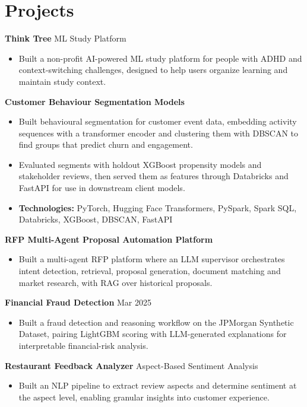 \documentclass[10pt,a4paper]{article}
\begin{document}
\section{Projects}
\textbf{Think Tree} \textbar{} ML Study Platform\par
\begin{itemize}
  \item Built a non-profit AI-powered ML study platform for people with ADHD and context-switching challenges, designed to help users organize learning and maintain study context.
\end{itemize}
\textbf{Customer Behaviour Segmentation Models}\par
\begin{itemize}
  \item Built behavioural segmentation for customer event data, embedding activity sequences with a transformer encoder and clustering them with DBSCAN to find groups that predict churn and engagement.
  \item Evaluated segments with holdout XGBoost propensity models and stakeholder reviews, then served them as features through Databricks and FastAPI for use in downstream client models.
  \item \textbf{Technologies:} PyTorch, Hugging Face Transformers, PySpark, Spark SQL, Databricks, XGBoost, DBSCAN, FastAPI
\end{itemize}
\textbf{RFP Multi-Agent Proposal Automation Platform}\par
\begin{itemize}
  \item Built a multi-agent RFP platform where an LLM supervisor orchestrates intent detection, retrieval, proposal generation, document matching and market research, with RAG over historical proposals.
\end{itemize}
\textbf{Financial Fraud Detection} \textbar{} Mar 2025\par
\begin{itemize}
  \item Built a fraud detection and reasoning workflow on the JPMorgan Synthetic Dataset, pairing LightGBM scoring with LLM-generated explanations for interpretable financial-risk analysis.
\end{itemize}
\textbf{Restaurant Feedback Analyzer} \textbar{} Aspect-Based Sentiment Analysis\par
\begin{itemize}
  \item Built an NLP pipeline to extract review aspects and determine sentiment at the aspect level, enabling granular insights into customer experience.
\end{itemize}
\end{document}
